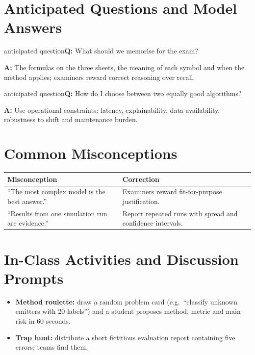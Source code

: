 \documentclass[11pt]{article}
\begin{document}
\section{Anticipated Questions and Model Answers}

\begin{question}{anticipated question}\textbf{Q:} What should we memorise for the exam?\par\smallskip\textbf{A:} The formulas on the three sheets, the meaning of each symbol and when the method applies; examiners reward correct reasoning over recall.\end{question}

\begin{question}{anticipated question}\textbf{Q:} How do I choose between two equally good algorithms?\par\smallskip\textbf{A:} Use operational constraints: latency, explainability, data availability, robustness to shift and maintenance burden.\end{question}

\section{Common Misconceptions}\begin{center}\small\renewcommand{\arraystretch}{1.35}\begin{tabularx}{\textwidth}{@{}>{\raggedright\arraybackslash}X >{\raggedright\arraybackslash}X@{}}\toprule\textbf{Misconception} & \textbf{Correction}\\\midrule``The most complex model is the best answer.'' & Examiners reward fit-for-purpose justification.\\
``Results from one simulation run are evidence.'' & Report repeated runs with spread and confidence intervals.\\\bottomrule\end{tabularx}\end{center}

\section{In-Class Activities and Discussion Prompts}\label{sec:act}\begin{itemize}\item \textbf{Method roulette:} draw a random problem card (e.g.\ ``classify unknown emitters with 20 labels'') and a student proposes method, metric and main risk in 60 seconds.\item \textbf{Trap hunt:} distribute a short fictitious evaluation report containing five errors; teams find them.\end{itemize}
\end{document}
